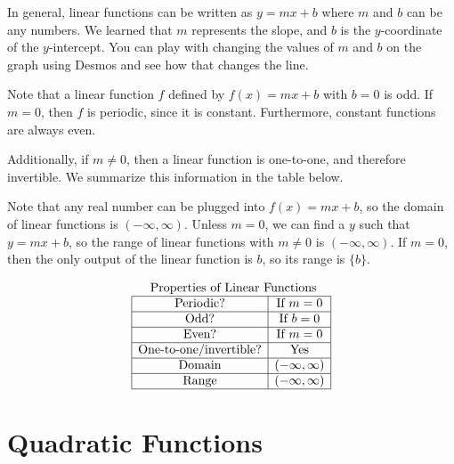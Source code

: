 \documentclass[nooutcomes]{ximera}
\begin{document}
In general, linear functions can be written as $y=mx+b$ where $m$ and $b$ can be any numbers. We learned that $m$ represents the slope, and $b$ is the $y$-coordinate of the $y$-intercept. You can play with changing the values of $m$ and $b$ on the graph using Desmos and see how that changes the line. 
 
\begin{center} 
\end{center}
 
Note that a linear function $f$ defined by $f(x) = mx + b$ with $b = 0$ is odd. If $m = 0$, then $f$ is periodic, since it is constant. Furthermore, constant functions are always even.
 
Additionally, if $m \ne 0$, then a linear function is one-to-one, and therefore invertible. We summarize this information in the table below.
 
 
Note that any real number can be plugged into $f(x) = mx + b$, so the domain of linear functions is $(-\infty, \infty)$. Unless $m = 0$, we can find a $y$ such that $y = mx + b$, so the range of linear functions with $m \ne 0$ is $(-\infty, \infty)$. If $m = 0$, then the only output of the linear function is $b$, so its range is $\{b\}$.
 
\[
\begin{array}{  c  }
\text{ Properties of Linear Functions} \\
 \begin{array}{|c|c|}
 \hline
\text{Periodic?} & \text{If } m = 0 \\ \hline
\text{Odd?} & \text{If } b = 0 \\ \hline
\text{Even?} & \text{If } m = 0 \\ \hline
\text{One-to-one/invertible?} & \text{Yes}\\ \hline
\text{Domain} & (-\infty,\infty)\\ \hline
\text{Range} & (-\infty,\infty)\\ \hline
\end{array}
\end{array}
\]
 
\newpage
 
 
\section{Quadratic Functions}
 
\end{document}
